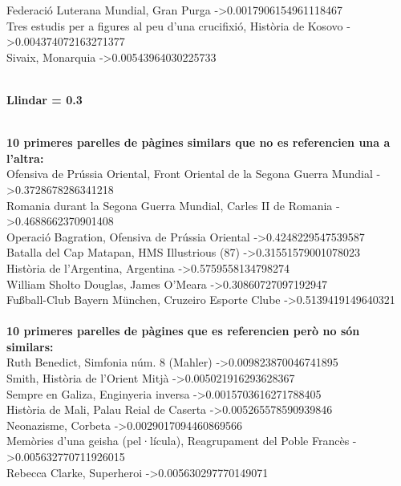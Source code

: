 \documentclass[11pt,a4paper,twoside]{report}
\begin{document}
Federació Luterana Mundial, Gran Purga -\textgreater 0.0017906154961118467 \\ 
Tres estudis per a figures al peu d'una crucifixió, Història de Kosovo -\textgreater 0.004374072163271377 \\ 
Sivaix, Monarquia -\textgreater 0.00543964030225733 \\ 
 \\ 
\newline
\centerline{ \textbf{Llindar = 0.3} }
\newline
 \\ 
\textbf{10 primeres parelles de pàgines similars que no es referencien una a l'altra:} \\ 
Ofensiva de Prússia Oriental, Front Oriental de la Segona Guerra Mundial -\textgreater 0.3728678286341218 \\ 
Romania durant la Segona Guerra Mundial, Carles II de Romania -\textgreater 0.4688662370901408 \\ 
Operació Bagration, Ofensiva de Prússia Oriental -\textgreater 0.4248229547539587 \\ 
Batalla del Cap Matapan, HMS Illustrious (87) -\textgreater 0.31551579001078023 \\ 
Història de l'Argentina, Argentina -\textgreater 0.5759558134798274 \\ 
William Sholto Douglas, James O'Meara -\textgreater 0.30860727097192947 \\ 
Fußball-Club Bayern München, Cruzeiro Esporte Clube -\textgreater 0.5139419149640321 \\ 
 \\ 
\textbf{10 primeres parelles de pàgines que es referencien però no són similars:} \\ 
Ruth Benedict, Simfonia núm. 8 (Mahler) -\textgreater 0.009823870046741895 \\ 
Smith, Història de l'Orient Mitjà -\textgreater 0.005021916293628367 \\ 
Sempre en Galiza, Enginyeria inversa -\textgreater 0.0015703616271788405 \\ 
Història de Mali, Palau Reial de Caserta -\textgreater 0.005265578590939846 \\ 
Neonazisme, Corbeta -\textgreater 0.0029017094460869566 \\ 
Memòries d'una geisha (pel·lícula), Reagrupament del Poble Francès -\textgreater 0.005632770711926015 \\ 
Rebecca Clarke, Superheroi -\textgreater 0.005630297770149071 \\ 
\end{document}
